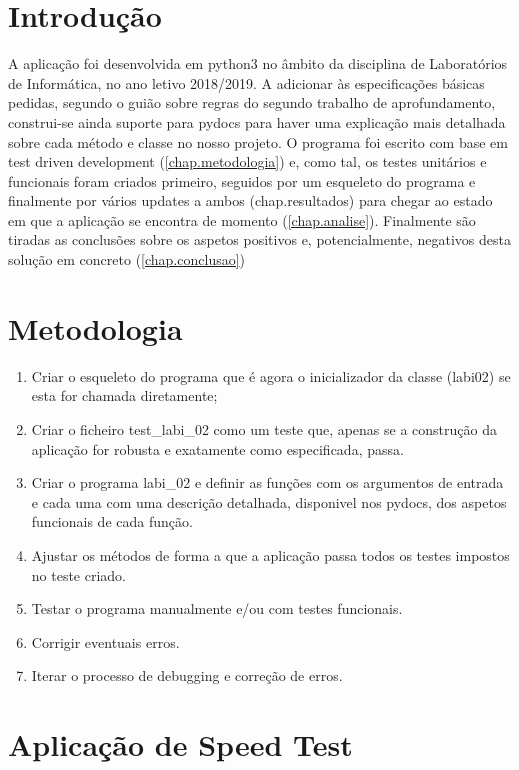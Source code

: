 \documentclass{report}
\begin{document}
\chapter{Introdução}
\label{chap.introducao}

A aplicação foi desenvolvida em python3 no âmbito da disciplina de Laboratórios de Informática, no ano letivo 2018/2019. A adicionar às especificações básicas pedidas, segundo o guião sobre regras do segundo trabalho de aprofundamento, construi-se ainda suporte para pydocs para haver uma explicação mais detalhada sobre cada método e classe no nosso projeto. O programa foi escrito com base em test driven development  (\autoref{chap.metodologia}) e, como tal, os testes unitários e funcionais foram criados primeiro, seguidos por um esqueleto do programa e finalmente por vários updates a ambos ({chap.resultados}) para chegar ao estado em que a aplicação se encontra de momento (\autoref{chap.analise}). Finalmente são tiradas as conclusões sobre os aspetos positivos e, potencialmente, negativos desta solução em concreto (\autoref{chap.conclusao})


\chapter{Metodologia}
\label{chap.metodologia}

\begin{enumerate}
	\item Criar o esqueleto do programa que é agora o inicializador da classe (labi02) se esta for chamada diretamente;
	\item Criar o ficheiro test\_labi\_02 como um teste que, apenas se a construção da aplicação for robusta e exatamente como especificada, passa.
	\item Criar o programa labi\_02 e definir as funções com os argumentos de entrada e cada uma com uma descrição detalhada, disponivel nos pydocs, dos aspetos funcionais de cada função.
	\item Ajustar os métodos de forma a que a aplicação passa todos os testes impostos no teste criado.
	\item Testar o programa manualmente e/ou com testes funcionais.
	\item Corrigir eventuais erros.
	\item Iterar o processo de debugging e correção de erros.
\end{enumerate}


\chapter{Aplicação de Speed Test}
\label{chap.Aplicação de Speed Test}
\end{document}
